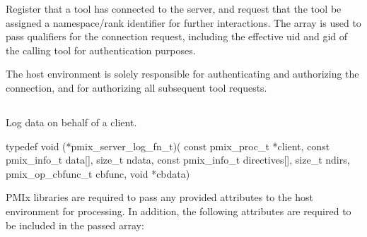 \optattrend

\descr

Register that a tool has connected to the server, and request that the tool be assigned a namespace/rank identifier for further interactions.
The  array is used to pass qualifiers for the connection request, including the effective uid and gid of the calling tool for authentication purposes.

\advicermstart
The host environment is solely responsible for authenticating and authorizing the connection, and for authorizing all subsequent tool requests.
\advicermend


\subsection{}

\summary

Log data on behalf of a client.

\format

\cspecificstart
\begin{codepar}
typedef void (*pmix_server_log_fn_t)(
                             const pmix_proc_t *client,
                             const pmix_info_t data[], size_t ndata,
                             const pmix_info_t directives[], size_t ndirs,
                             pmix_op_cbfunc_t cbfunc, void *cbdata)
\end{codepar}
\cspecificend

\begin{arglist}
\end{arglist}


\reqattrstart
\ac{PMIx} libraries are required to pass any provided attributes to the host environment for processing. In addition, the following attributes are required to be included in the passed  array:


